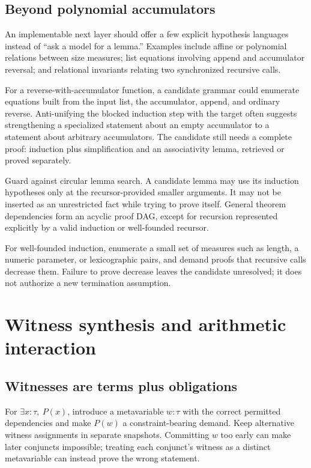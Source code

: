 \documentclass[11pt,letterpaper]{article}
\theoremstyle{definition}\newtheorem{definition}[proposition]{Definition}
\begin{document}
\subsection{Beyond polynomial accumulators}
An implementable next layer should offer a few explicit hypothesis languages instead of ``ask a model for a lemma.'' Examples include affine or polynomial relations between size measures; list equations involving append and accumulator reversal; and relational invariants relating two synchronized recursive calls.

For a reverse-with-accumulator function, a candidate grammar could enumerate equations built from the input list, the accumulator, append, and ordinary reverse. Anti-unifying the blocked induction step with the target often suggests strengthening a specialized statement about an empty accumulator to a statement about arbitrary accumulators. The candidate still needs a complete proof: induction plus simplification and an associativity lemma, retrieved or proved separately.

Guard against circular lemma search. A candidate lemma may use its induction hypotheses only at the recursor-provided smaller arguments. It may not be inserted as an unrestricted fact while trying to prove itself. General theorem dependencies form an acyclic proof DAG, except for recursion represented explicitly by a valid induction or well-founded recursor.

For well-founded induction, enumerate a small set of measures such as length, a numeric parameter, or lexicographic pairs, and demand proofs that recursive calls decrease them. Failure to prove decrease leaves the candidate unresolved; it does not authorize a new termination assumption.

\section{Witness synthesis and arithmetic interaction}
\label{sec:witness}
\subsection{Witnesses are terms plus obligations}
For $\exists x:\tau,\ P(x)$, introduce a metavariable $w:\tau$ with the correct permitted dependencies and make $P(w)$ a constraint-bearing demand. Keep alternative witness assignments in separate snapshots. Committing $w$ too early can make later conjuncts impossible; treating each conjunct's witness as a distinct metavariable can instead prove the wrong statement.
\end{document}
